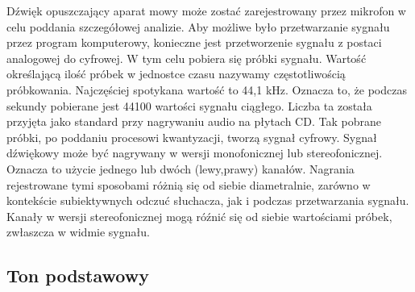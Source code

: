\documentclass[a4paper,12 pt]{article}
\begin{document}
Dźwięk opuszczający aparat mowy może zostać zarejestrowany przez mikrofon w celu poddania szczegółowej analizie. Aby możliwe było przetwarzanie sygnału przez program komputerowy, konieczne jest przetworzenie sygnału z postaci analogowej do cyfrowej. W tym celu pobiera się próbki sygnału. Wartość określającą ilość próbek w jednostce czasu nazywamy częstotliwością próbkowania. Najczęściej spotykana wartość to 44,1 kHz. Oznacza to, że podczas sekundy pobierane jest 44100 wartości sygnału ciągłego. Liczba ta została przyjęta jako standard przy nagrywaniu audio na płytach CD. Tak pobrane próbki, po poddaniu procesowi kwantyzacji, tworzą sygnał cyfrowy.
Sygnał dźwiękowy może być nagrywany w wersji monofonicznej lub stereofonicznej. Oznacza to użycie jednego lub dwóch (lewy,prawy) kanałów. Nagrania rejestrowane tymi sposobami różnią się od siebie diametralnie, zarówno w kontekście subiektywnych odczuć słuchacza, jak i podczas przetwarzania sygnału. Kanały w wersji stereofonicznej mogą róźnić się od siebie wartościami próbek, zwłaszcza w widmie sygnału.





\subsection{Ton podstawowy}
\end{document}
